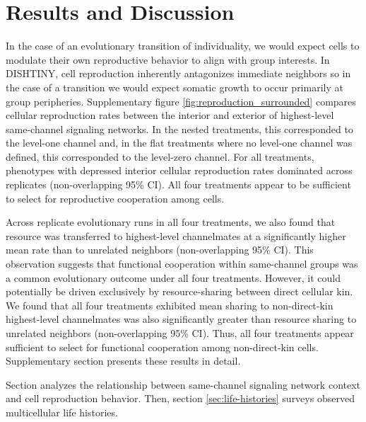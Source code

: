 \section{Results and Discussion}

In the case of an evolutionary transition of individuality, we would expect cells to modulate their own reproductive behavior to align with group interests.
In DISHTINY, cell reproduction inherently antagonizes immediate neighbors so in the case of a transition we would expect somatic growth to occur primarily at group peripheries.
Supplementary figure \ref{fig:reproduction_surrounded} compares cellular reproduction rates between the interior and exterior of highest-level same-channel signaling networks.
In the nested treatments, this corresponded to the level-one channel and, in the flat treatments where no level-one channel was defined, this corresponded to the level-zero channel.
For all treatments, phenotypes with depressed interior cellular reproduction rates dominated across replicates (non-overlapping 95\% CI).
All four treatments appear to be sufficient to select for reproductive cooperation among cells.

Across replicate evolutionary runs in all four treatments, we also found that resource was transferred to highest-level channelmates at a significantly higher mean rate than to unrelated neighbors (non-overlapping 95\% CI).
This observation suggests that functional cooperation within same-channel groups was a common evolutionary outcome under all four treatments.
However, it could potentially be driven exclusively by resource-sharing between direct cellular kin.
We found that all four treatments exhibited mean sharing to non-direct-kin highest-level channelmates was also significantly greater than resource sharing to unrelated neighbors (non-overlapping 95\% CI).
Thus, all four treatments appear sufficient to select for functional cooperation among non-direct-kin cells.
Supplementary section \label{sec:resource-sharing} presents these results in detail.

Section \label{sec:resource-sharing} analyzes the relationship between same-channel signaling network context and cell reproduction behavior.
Then, section \ref{sec:life-histories} surveys observed multicellular life histories.

